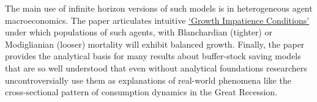 \documentclass[BufferStockTheory]{subfiles}
\begin{document}
The main use of infinite horizon versions of such models is in heterogeneous agent macroeconomics. The paper articulates intuitive \href{https://econ-ark.github.io/BufferStockTheory#GICAgg}{`Growth Impatience Conditions'} under which populations of such agents, with Blanchardian (tighter) or Modiglianian (looser) mortality will exhibit balanced growth.  Finally, the paper provides the analytical basis for many results about buffer-stock saving models that are so well understood that even without analytical foundations researchers uncontroversially use them as explanations of real-world phenomena like the cross-sectional pattern of consumption dynamics in the Great Recession.



\clearpage\vfill\eject
\begin{equation*}
  \label{eq:Dummy}
\end{equation*}

\onlyinsubfile{}
\end{document}
